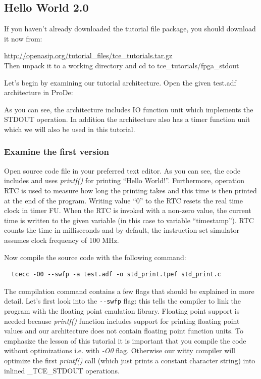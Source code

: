 \documentclass[twoside]{tceusermanual}
\begin{document}
\subsection{Hello World 2.0}

If you haven't already downloaded the tutorial file package, you should
download it now from:

\url{http://openasip.org/tutorial_files/tce_tutorials.tar.gz}\\

Then unpack it to a working directory and cd to tce\_tutorials/fpga\_stdout

Let's begin by examining our tutorial architecture. Open the given test.adf
architecture in ProDe:


As you can see, the architecture includes IO function unit which implements the
STDOUT operation. In addition the architecture also has a timer function unit
which we will also be used in this tutorial.

\subsubsection{Examine the first version}

Open source code file  in your preferred text
editor. As you can see, the code includes  and uses
\textit{printf()} for printing ``Hello World!''. Furthermore,
operation RTC is used to measure how long the printing takes and this
time is then printed at the end of the program. Writing value ``0'' to
the RTC resets the real time clock in timer FU. When the RTC is
invoked with a non-zero value, the current time is written to the
given variable (in this case to variable ``timestamp''). RTC counts
the time in milliseconds and by default, the instruction set simulator
assumes clock frequency of 100 MHz.

Now compile the source code with the following command:

\begin{verbatim}
  tcecc -O0 --swfp -a test.adf -o std_print.tpef std_print.c
\end{verbatim}

The compilation command contains a few flags that should be explained
in more detail. Let's first look into the \verb|--swfp| flag: this
tells the compiler to link the program with the floating point
emulation library. Floating point support is needed because
\textit{printf()} function includes support for printing floating
point values and our architecture does not contain floating point
function units. To emphasize the lesson of this tutorial it is
important that you compile the code without optimizations i.e. with
\textit{-O0} flag. Otherwise our witty compiler will optimize the
first \textit{printf()} call (which just prints a constant character
string) into inlined \_TCE\_STDOUT operations.
\end{document}

